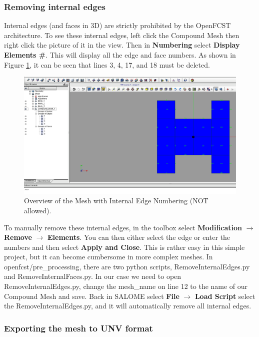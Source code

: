 \subsubsection{Removing internal edges}

Internal edges (and faces in 3D) are strictly prohibited by the OpenFCST architecture.  To see these internal edges, left click the Compound Mesh then right click the picture of it in the view. Then in \textbf{Numbering} select \textbf{Display Elements \#}. This will display all the edge and face numbers. As shown in Figure \ref{fig:no3.2.1.18}, it can be seen that lines 3, 4, 17, and 18 must be deleted. 
  
\begin{figure}[h!]
\begin{center}
\includegraphics[scale=0.40]{figures/SalomeStep7.png}
\caption{Overview of the Mesh with Internal Edge Numbering (NOT allowed).}
\label{fig:no3.2.1.18}
\end{center}
\end{figure}
  
To manually remove these internal edges, in the toolbox select \textbf{Modification} $\rightarrow$ \textbf{Remove} $\rightarrow$ \textbf{Elements}. You can then either select the edge or enter the numbers and then select \textbf{Apply and Close}. This is rather easy in this simple project, but it can become cumbersome in more complex meshes. In openfcst/pre\_processing, there are two python scripts, RemoveInternalEdges.py and RemoveInternalFaces.py. In our case we need to open RemoveInternalEdges.py, change the mesh\_name on line 12 to the name of our Compound Mesh and save. Back in SALOME select \textbf{File} $\rightarrow$ \textbf{Load Script} select the RemoveInternalEdges.py, and it will automatically remove all internal edges.
  
\subsubsection{Exporting the mesh to UNV format}

